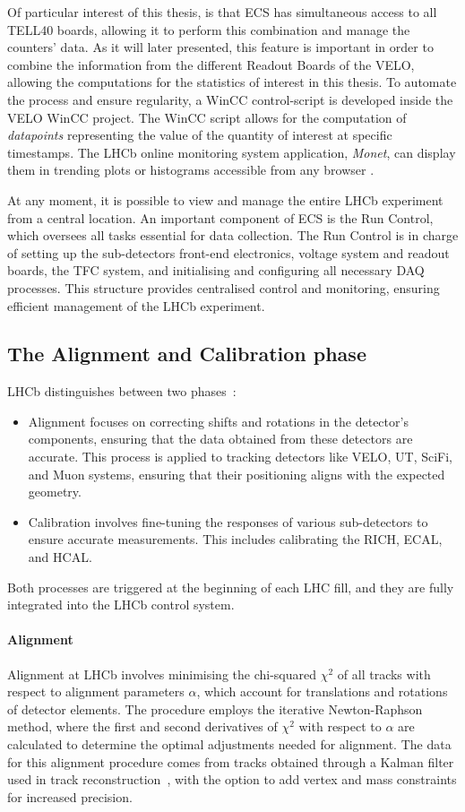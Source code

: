 Of particular interest of this thesis, is that ECS has simultaneous access to all TELL40 boards, allowing it to perform this combination and manage the counters' data. As it will later presented, this feature is important in order to combine the information from the different Readout Boards of the VELO, allowing the computations for the statistics of interest in this thesis. To automate the process and ensure regularity, a WinCC control-script is developed inside the VELO WinCC project. The WinCC script allows for the computation of \textit{datapoints} representing the value of the quantity of interest at specific timestamps. The LHCb online monitoring system application, \textit{Monet}, can display them in trending plots or histograms accessible from any browser \cite{Adinolfi:2298467}.

At any moment, it is possible to view and manage the entire LHCb experiment from a central location. An important component of ECS is the Run Control, which oversees all tasks essential for data collection. The Run Control is in charge of setting up the sub-detectors front-end electronics, voltage system and readout boards, the TFC system, and initialising and configuring all necessary DAQ processes. 
This structure provides centralised control and monitoring, ensuring efficient management of the LHCb experiment.

\subsection{The Alignment and Calibration phase}\label{sec:alignment}
LHCb distinguishes between two phases~\cite{Dziurda:2640712}:
\begin{itemize}
\item Alignment focuses on correcting shifts and rotations in the detector's components, ensuring that the data obtained from these detectors are accurate. This process is applied to tracking detectors like VELO, UT, SciFi, and Muon systems, ensuring that their positioning aligns with the expected geometry.
\item Calibration involves fine-tuning the responses of various sub-detectors to ensure accurate measurements. This includes calibrating the RICH, ECAL, and HCAL.
\end{itemize}
Both processes are triggered at the beginning of each LHC fill, and they are fully integrated into the LHCb control system. 
\paragraph{Alignment}
Alignment at LHCb involves minimising the chi-squared $\chi^2$ of all tracks with respect to alignment parameters $\alpha$, which account for translations and rotations of detector elements. The procedure employs the iterative Newton-Raphson method, where the first and second derivatives of $\chi^2$ with respect to $\alpha$ are calculated to determine the optimal adjustments needed for alignment. The data for this alignment procedure comes from tracks obtained through a Kalman filter used in track reconstruction~\cite{HULSBERGEN2009471}, with the option to add vertex and mass constraints for increased precision.

